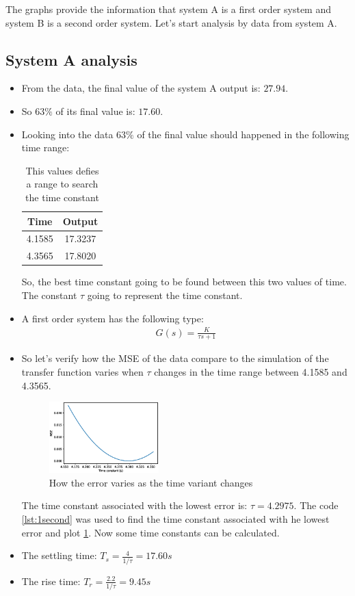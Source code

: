 \documentclass[a4paper]{article}
\begin{document}
The graphs provide the information that system A is a first order system and system B is a second order system. Let's start
analysis by data from system A.
\subsection*{System A analysis}
\begin{itemize}
    \item From the data, the final value of the system A output is: $27.94$.
    \item So $63\%$ of its final value is: $17.60$.
    \item Looking into the data $63\%$ of the final value should happened in the following time range:
    \begin{table}[H]
    \centering
    \begin{tabular}{|c|c|}
	\hline    
    Time & Output\\
    \hline
    4.1585 & 17.3237\\
    \hline
    4.3565 &	17.8020\\
    \hline
    \end{tabular}
    \caption{This values defies a range to search the time constant}
    \end{table}
	So, the best time constant going to be found between this two values of time. The constant $\tau$ going to represent the time constant.    
    \item A first order system has the following type:
    \begin{align*}
        G(s) = \frac{K}{\tau s+1}
    \end{align*}
	\item So let's verify how the MSE of the data compare to the simulation of the transfer function varies when $\tau$ changes in the time range between 4.1585 and 4.3565.
	
\begin{figure}[H]
		\centering
		\includegraphics[width=0.4\textwidth]{Figures/Question1/EXE_1_MSE_TIME_CONSTANT.eps}
		\caption{How the error varies as the time variant changes}	
		\label{fig:mse}
\end{figure}
	
The time constant associated with the lowest error is: $\tau=4.2975$. The code \ref{lst:1second} was used to find the time constant associated with he lowest error and plot \ref{fig:mse}. Now some time constants can be calculated.
    \item The settling time: $T_s=\frac{4}{1/\tau}=17.60s$
    \item The rise time: $T_r = \frac{2.2}{1/\tau}=9.45 s$
\end{itemize}
\end{document}
